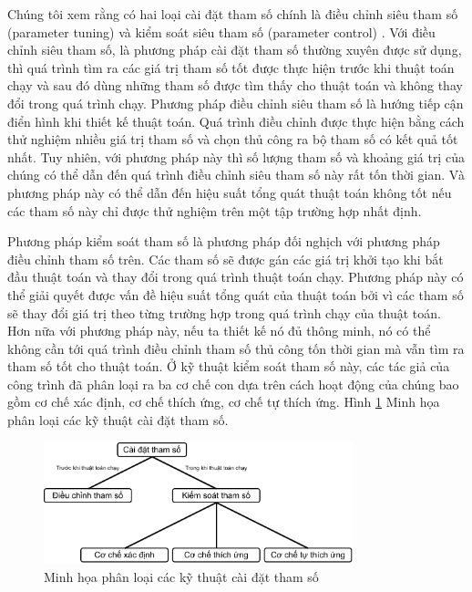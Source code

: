 Chúng tôi xem rằng có hai loại cài đặt tham số chính là điều chỉnh siêu tham số (parameter tuning) và kiểm soát siêu tham số (parameter control) \cite{771166}. Với điều chỉnh siêu tham số, là phương pháp cài đặt tham số thường xuyên được sử dụng, thì quá trình tìm ra các giá trị tham số tốt được thực hiện trước khi thuật toán chạy và sau đó dùng những tham số được tìm thấy cho thuật toán và không thay đổi trong quá trình chạy. Phương pháp điều chỉnh siêu tham số là hướng tiếp cận điển hình khi thiết kế thuật toán. Quá trình điều chỉnh được thực hiện bằng cách thử nghiệm nhiều giá trị tham số và chọn thủ công ra bộ tham số có kết quả tốt nhất. Tuy nhiên, với phương pháp này thì số lượng tham số và khoảng giá trị của chúng có thể dẫn đến quá trình điều chỉnh siêu tham số này rất tốn thời gian. Và phương pháp này có thể dẫn đến hiệu suất tổng quát thuật toán không tốt nếu các tham số này chỉ được thử nghiệm trên một tập trường hợp nhất định.

Phương pháp kiểm soát tham số là phương pháp đối nghịch với phương pháp điều chỉnh tham số trên. Các tham số sẽ được gán các giá trị khởi tạo khi bắt đầu thuật toán và thay đổi trong quá trình thuật toán chạy. Phương pháp này có thể giải quyết được vấn đề hiệu suất tổng quát của thuật toán bởi vì các tham số sẽ thay đổi giá trị theo từng trường hợp trong quá trình chạy của thuật toán. Hơn nữa với phương pháp này, nếu ta thiết kế nó đủ thông minh, nó có thể không cần tới quá trình điều chỉnh tham số thủ công tốn thời gian mà vẫn tìm ra tham số tốt cho thuật toán. Ở kỹ thuật kiểm soát tham số này, các tác giả của công trình \cite{771166} đã phân loại ra ba cơ chế con dựa trên cách hoạt động của chúng bao gồm cơ chế xác định, cơ chế thích ứng, cơ chế tự thích ứng. Hình \ref{fig:parameterSettingTaxonomy} Minh họa phân loại các kỹ thuật cài đặt tham số.

\begin{figure}[ht!]
    \centering
    \includegraphics[width=0.8\textwidth]{Figures/Parameter setting.drawio.pdf}
    \caption[Minh họa phân loại các kỹ thuật cài đặt tham số.]{Minh họa phân loại các kỹ thuật cài đặt tham số}
    \label{fig:parameterSettingTaxonomy}
\end{figure}

